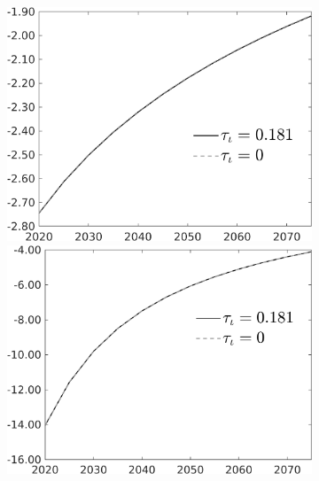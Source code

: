 \begin{figure}[h!!]
\begin{subfigure}{0.9\textwidth}
\begin{minipage}[]{0.32\textwidth}
			\end{minipage}
			\begin{minipage}[]{0.32\textwidth}
				\includegraphics[width=1\textwidth]{../../codding_model/own_basedOnFried/optimalPol_010922_revision/figures/all_13Sept22/PerdifNoTauf_Equlab_regime0_CompTaul_EY_spillover0_nsk0_xgr0_knspil0_sep0_LFlimit0_emsbase0_countec0_GovRev0_etaa0.79_lgd1.png}
			\end{minipage}
		\begin{minipage}[]{0.32\textwidth}
		\includegraphics[width=1\textwidth]{../../codding_model/own_basedOnFried/optimalPol_010922_revision/figures/all_13Sept22/PerdifNoTauf_Equlab_regime0_CompTaul_snS_spillover0_nsk0_xgr0_knspil0_sep0_LFlimit0_emsbase0_countec0_GovRev0_etaa0.79_lgd1.png}

\end{minipage}
\end{subfigure}
\end{figure}
